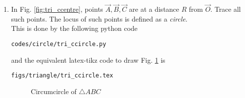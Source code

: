\renewcommand{\theequation}{\theenumi}
\begin{enumerate}[label=\arabic*.,ref=\thesubsection.\theenumi]

\item In Fig. \ref{fig:tri_ccentre}, points $\vec{A}, \vec{B}, \vec{C}$  are at a distance $R$ from $\vec{O}$.  Trace all such points. The locus of such points is defined as a {\em circle}.
%
\\
\solution This is done by the following python code
%
\begin{lstlisting}
codes/circle/tri_ccircle.py
\end{lstlisting}
%
and the equivalent latex-tikz code to draw Fig. \ref{fig:tri_ccircle} is
%
\begin{lstlisting}
figs/triangle/tri_ccircle.tex
\end{lstlisting}

\begin{figure}[!ht]
	\begin{center}
		
		\resizebox{\columnwidth}{!}{}
	\end{center}
	\caption{Circumcircle of $\triangle ABC$}
	\label{fig:tri_ccircle}	
\end{figure}
%
%

\end{enumerate}

